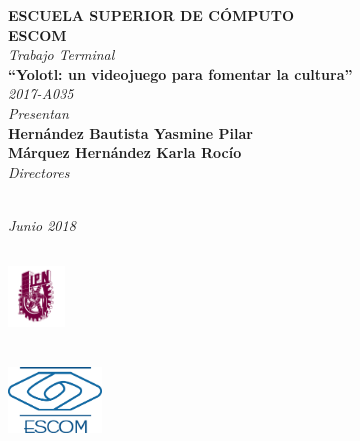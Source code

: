 \begin{titlepage}
{\begin{center}
	    {\fontsize{16}{20} \textbf{ESCUELA SUPERIOR DE CÓMPUTO}}\vspace{1cm}\\[1cm]
	    {\fontsize{20}{20} \textbf{ESCOM}}\vspace{2cm}\\
	    
	    {\fontsize{14}{20} \textit{Trabajo Terminal}}\vspace{1cm}\\
	    {\fontsize{16}{20} \textbf{``Yolotl: un videojuego para fomentar la cultura''}}\vspace{0.5cm}\\
	    {\fontsize{14}{20} \textit{2017-A035}}\vspace{1.5cm}\\
	    {\fontsize{14}{20} \textit{Presentan}}\\
	    {\fontsize{14}{20} \textbf{Hernández Bautista Yasmine Pilar}}\vspace{1cm}\\
	   	{\fontsize{14}{20} \textbf{Márquez Hernández Karla Rocío}}\vspace{1.5cm}\\
	   \fontsize{14}{20} \textit{Directores}\\

	    
	    
{\fboxrule=0pt \fboxsep=6pt	    
}\\[3.5cm]
\end{center}
	    
	    \hfill  \fontsize{12}{20} \textit{Junio 2018}
	    
	}
\end{titlepage}

\thispagestyle{empty}

\parbox{18cm}{
\parbox{1.5cm}{
\includegraphics[width=1.5cm,height=2.5cm]{imagen/IPN.png}
}
\parbox{12cm}{
}
\parbox{1.5cm}{
\includegraphics[width=2.5cm,height=2cm]{imagen/logoescom.png}
}\vspace{1.5cm} 
}


